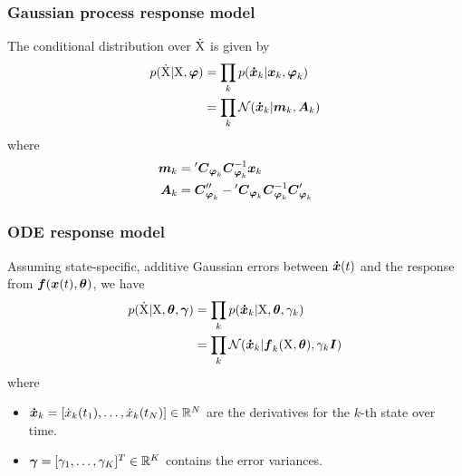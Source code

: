 \begin{frame}[t]
    \frametitle{Gaussian process response model}
    The conditional distribution over $\mathrm{\dot{X}}$ is given by
    \begin{align}
        p(\mathrm{\dot{X}}\vert\mathrm{X},\boldsymbol{\varphi}) 
        & = 
        \prod_k{
            p(\boldsymbol{\dot{x}}_{k}\vert\boldsymbol{x}_{k},\boldsymbol{\varphi}_{k})
        }
        \nonumber
        \\
        & = 
        \prod_k{
            \mathcal{N}(\boldsymbol{\dot{x}}_{k}\vert\boldsymbol{m}_{k}, \boldsymbol{A}_{k})
        }        
        \label{eq-gmgp-dx-posterior}
    \end{align}            
    where
    \begin{align}
        \boldsymbol{m}_{k} & = {}^{\prime}\boldsymbol{C}_{\boldsymbol{\varphi}_{k}}\boldsymbol{C}_{\boldsymbol{\varphi}_{k}}^{-1}\boldsymbol{x}_{k}
        \nonumber
        \\
        \boldsymbol{A}_{k} & = \boldsymbol{C}^{\prime\prime}_{\boldsymbol{\varphi}_{k}} - {}^{\prime}\boldsymbol{C}_{\boldsymbol{\varphi}_{k}}\boldsymbol{C}_{\boldsymbol{\varphi}_{k}}^{-1}\boldsymbol{C}^{\prime}_{\boldsymbol{\varphi}_{k}}
        \nonumber
    \end{align}    
\end{frame}

\begin{frame}[t]
    \frametitle{ODE response model}
    Assuming state-specific, additive Gaussian errors between $\boldsymbol{\dot{x}}(t)$ and the response from $\boldsymbol{f}(\boldsymbol{x}(t), \boldsymbol{\theta})$, we have
    \begin{align}
        p(\mathrm{\dot{X}}\vert\mathrm{X},\boldsymbol{\theta},\boldsymbol{\gamma}) 
        & = 
        \prod_k{
            p(\boldsymbol{\dot{x}}_{k}\vert\mathrm{X},\boldsymbol{\theta},\gamma_{k})
        }
        \nonumber
        \\
        & = 
        \prod_k{
            \mathcal{N}(\boldsymbol{\dot{x}}_{k}\vert\boldsymbol{f}_{k}(\mathrm{X}, \boldsymbol{\theta}),\gamma_{k}\boldsymbol{I})
        }
        \label{eq-gmgp-dx-ode-response}
    \end{align}
    where 
    \begin{itemize}
    	\item[] $\boldsymbol{\dot{x}}_{k} = [\dot{x}_{k}(t_{1}),\dots,\dot{x}_{k}(t_{N})] \in \mathbb{R}^N$ are the derivatives for the $k$-th state over time.
    	\item[] $\boldsymbol{\gamma} = [\gamma_{1},\dots,\gamma_{K}]^T \in \mathbb{R}^K$ contains the error variances.
    \end{itemize}
\end{frame}

